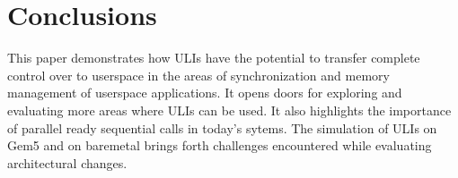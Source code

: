 \section{Conclusions}

This paper demonstrates how ULIs have the potential to transfer complete control
over to userspace in the areas of synchronization and memory management of
userspace applications. It opens doors for exploring and evaluating more areas
where ULIs can be used. It also highlights the importance of parallel ready
sequential calls in today's sytems. The simulation of ULIs on Gem5 and on
baremetal brings forth challenges encountered while evaluating architectural
changes.

